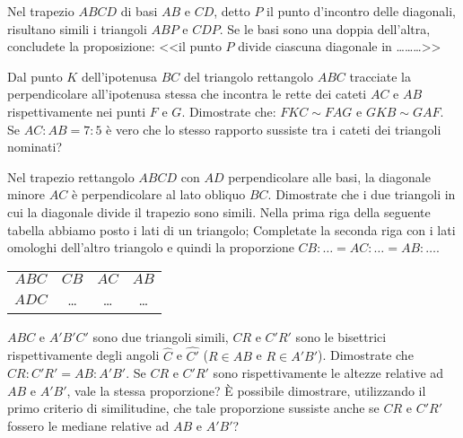 \begin{multicols}{2}
\begin{esercizio}
\label{ese:6.60}
Nel trapezio $ABCD$ di basi $AB$ e $CD$, detto $P$ il punto d'incontro delle diagonali, risultano simili i triangoli $ABP$ e $CDP$. Se le basi sono una doppia dell'altra, concludete la proposizione: <<il punto $P$ divide ciascuna diagonale in \ldots\ldots\ldots{}>>
\end{esercizio}

\begin{esercizio}
\label{ese:6.61}
Dal punto $K$ dell'ipotenusa $BC$ del triangolo rettangolo $ABC$ tracciate la perpendicolare all'ipotenusa stessa che incontra le rette dei cateti $AC$ e $AB$ rispettivamente nei punti $F$ e $G$. Dimostrate che: $FKC\sim FAG$ e $GKB\sim GAF$. Se $AC:AB=7:5$ è vero che lo stesso rapporto sussiste tra i cateti dei triangoli nominati?
\end{esercizio}

\begin{esercizio}
\label{ese:6.62}
Nel trapezio rettangolo $ABCD$ con $AD$ perpendicolare alle basi, la diagonale minore $AC$ è perpendicolare al lato obliquo $BC$. Dimostrate che i due triangoli in cui la diagonale divide il trapezio sono simili. Nella prima riga della seguente tabella abbiamo posto i lati di un triangolo; Completate la seconda riga con i lati omologhi dell'altro triangolo e quindi la proporzione $CB:\ldots{}=AC:\ldots{}=AB:\ldots{}$.

\begin{center}
\begin{tabular}{cccc}
\toprule
$ABC$ & $CB$ & $AC$ & $AB$\\
$ADC$ & \ldots{} & \ldots{} & \ldots{}\\
\bottomrule
\end{tabular}
\end{center}
\end{esercizio}

\begin{esercizio}
\label{ese:6.63}
$ABC$ e $A'B'C'$ sono due triangoli simili, $CR$ e $C'R'$ sono le bisettrici rispettivamente degli angoli $\widehat{C}$ e $\widehat{C'}$ ($R\in AB$ e $R\in A'B'$). Dimostrate che $CR : C'R' = AB : A'B'$. Se $CR$ e $C'R'$ sono rispettivamente le altezze relative ad $AB$ e $A'B'$, vale la stessa proporzione? \`E possibile dimostrare, utilizzando il primo criterio di similitudine, che tale proporzione sussiste anche se $CR$ e $C'R'$ fossero le mediane relative ad $AB$ e $A'B'$?
\end{esercizio}


\end{multicols}
